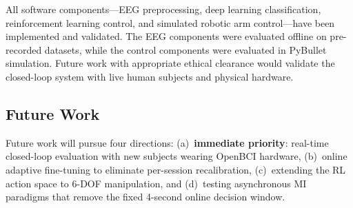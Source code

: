 \documentclass[12pt, a4paper]{article}
\begin{document}
All software components---EEG preprocessing, deep learning classification, reinforcement learning control, and simulated robotic arm control---have been implemented and validated. The EEG components were evaluated offline on pre-recorded datasets, while the control components were evaluated in PyBullet simulation. Future work with appropriate ethical clearance would validate the closed-loop system with live human subjects and physical hardware.

\subsection{Future Work}

Future work will pursue four directions: (a)~\textbf{immediate priority}: real-time closed-loop evaluation with new subjects wearing OpenBCI hardware, (b)~online adaptive fine-tuning to eliminate per-session recalibration, (c)~extending the RL action space to 6-DOF manipulation, and (d)~testing asynchronous MI paradigms that remove the fixed 4-second online decision window.
\end{document}
